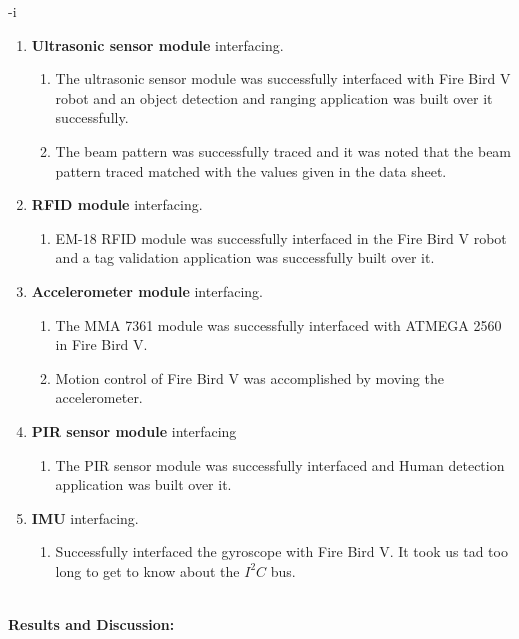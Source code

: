 -i\documentclass[a4paper,12 pt]{article}
\begin{document}
 
 \begin{enumerate}
				 
				\item  \textbf{Ultrasonic sensor module} interfacing.
				\begin{enumerate}
				 
				\item  The ultrasonic sensor module was successfully interfaced with Fire Bird V robot and an object detection and ranging application was built over it successfully.
				\item  The beam pattern was successfully traced and it was noted that the beam pattern traced matched with the values given in the data sheet.
				
				\end{enumerate}
				\item  \textbf{RFID module} interfacing.
				\begin{enumerate}
				\item  EM-18 RFID module was successfully interfaced in the Fire Bird V robot and a tag validation application was successfully built over it.
				\end{enumerate}
				\item  \textbf{Accelerometer module} interfacing.
				\begin{enumerate}
				\item The MMA 7361 module was successfully interfaced with ATMEGA 2560 in Fire Bird V. 
				\item  Motion control of Fire Bird V was accomplished by moving the accelerometer.
				\end{enumerate}
				\item \textbf{PIR sensor module} interfacing
				\begin{enumerate}
				\item  The PIR sensor module was successfully interfaced and Human detection application was built over it.
				\end{enumerate}
				\item \textbf{IMU} interfacing.
				\begin{enumerate}
				\item  Successfully interfaced the gyroscope with Fire Bird V. It took us tad too long to get to know about the $I^2C$ bus.\\\\ 
				\end{enumerate}
	\end{enumerate}
\textbf{Results and Discussion:}\\ 
\end{document}
